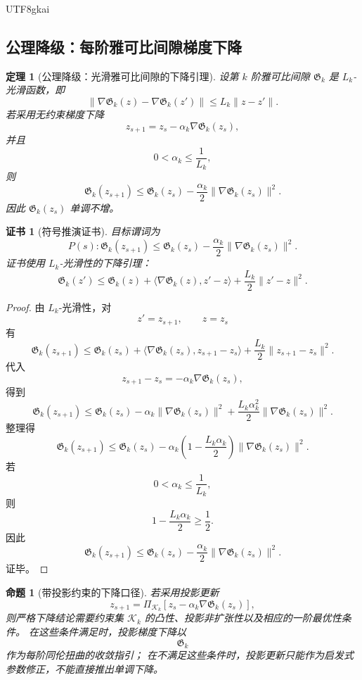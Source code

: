 \documentclass[12pt]{article}
\newtheorem{theorem}{定理}[section]
\newtheorem{proposition}{命题}[section]
\newtheorem{Certificate}{证书}[section]
\begin{document}
\begin{CJK*}{UTF8}{gkai}
\subsection{公理降级：每阶雅可比间隙梯度下降}
\label{subsec:tex55-jacgap-gradient-descent}

\begin{theorem}[公理降级：光滑雅可比间隙的下降引理]
\label{thm:tex55-jacgap-smooth-descent}
设第 \(k\) 阶雅可比间隙 \(\mathfrak G_k\) 是 \(L_k\)-光滑函数，即
\[
  \lVert\nabla\mathfrak G_k(z)-\nabla\mathfrak G_k(z')\rVert
  \le
  L_k\lVert z-z'\rVert.
\]
若采用无约束梯度下降
\[
  z_{s+1}=z_s-\alpha_k\nabla\mathfrak G_k(z_s),
\]
并且
\[
  0<\alpha_k\le\frac1{L_k},
\]
则
\[
  \mathfrak G_k(z_{s+1})
  \le
  \mathfrak G_k(z_s)
  -
  \frac{\alpha_k}{2}
  \lVert\nabla\mathfrak G_k(z_s)\rVert^2.
\]
因此 \(\mathfrak G_k(z_s)\) 单调不增。
\end{theorem}

\begin{Certificate}[符号推演证书]
\label{cert:tex55-jacgap-smooth-descent}
目标谓词为
\[
  P(s):
  \mathfrak G_k(z_{s+1})
  \le
  \mathfrak G_k(z_s)
  -
  \frac{\alpha_k}{2}
  \lVert\nabla\mathfrak G_k(z_s)\rVert^2.
\]
证书使用 \(L_k\)-光滑性的下降引理：
\[
  \mathfrak G_k(z')
  \le
  \mathfrak G_k(z)
  +
  \langle\nabla\mathfrak G_k(z),z'-z\rangle
  +
  \frac{L_k}{2}\lVert z'-z\rVert^2.
\]
\end{Certificate}

\begin{proof}
由 \(L_k\)-光滑性，对
\[
  z'=z_{s+1},
  \qquad
  z=z_s
\]
有
\[
  \mathfrak G_k(z_{s+1})
  \le
  \mathfrak G_k(z_s)
  +
  \langle\nabla\mathfrak G_k(z_s),z_{s+1}-z_s\rangle
  +
  \frac{L_k}{2}\lVert z_{s+1}-z_s\rVert^2.
\]
代入
\[
  z_{s+1}-z_s
  =
  -\alpha_k\nabla\mathfrak G_k(z_s),
\]
得到
\[
  \mathfrak G_k(z_{s+1})
  \le
  \mathfrak G_k(z_s)
  -
  \alpha_k\lVert\nabla\mathfrak G_k(z_s)\rVert^2
  +
  \frac{L_k\alpha_k^2}{2}
  \lVert\nabla\mathfrak G_k(z_s)\rVert^2.
\]
整理得
\[
  \mathfrak G_k(z_{s+1})
  \le
  \mathfrak G_k(z_s)
  -
  \alpha_k
  \left(
  1-\frac{L_k\alpha_k}{2}
  \right)
  \lVert\nabla\mathfrak G_k(z_s)\rVert^2.
\]
若
\[
  0<\alpha_k\le\frac1{L_k},
\]
则
\[
  1-\frac{L_k\alpha_k}{2}\ge\frac12.
\]
因此
\[
  \mathfrak G_k(z_{s+1})
  \le
  \mathfrak G_k(z_s)
  -
  \frac{\alpha_k}{2}
  \lVert\nabla\mathfrak G_k(z_s)\rVert^2.
\]
证毕。
\end{proof}

\begin{proposition}[带投影约束的下降口径]
\label{prop:tex55-jacgap-projected-descent}
若采用投影更新
\[
  z_{s+1}
  =
  \Pi_{\mathcal K_k}
  \left[
  z_s-\alpha_k\nabla\mathfrak G_k(z_s)
  \right],
\]
则严格下降结论需要约束集 \(\mathcal K_k\) 的凸性、投影非扩张性以及相应的一阶最优性条件。
在这些条件满足时，投影梯度下降以
\[
  \mathfrak G_k
\]
作为每阶同伦扭曲的收敛指引；
在不满足这些条件时，投影更新只能作为启发式参数修正，不能直接推出单调下降。
\end{proposition}


\end{CJK*}
\end{document}

